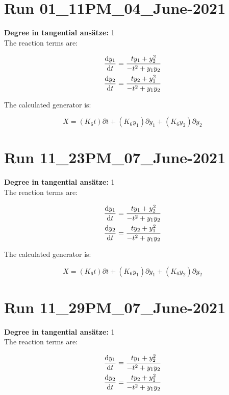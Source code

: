 \section*{Run 01\_11PM\_04\_June-2021}
\textbf{Degree in tangential ansätze:}	1\\
The reaction terms are:

\begin{align*}
\dv{y_{1}}{t}&=\frac{t y_{1} + y_{2}^{2}}{- t^{2} + y_{1} y_{2}}\\
\dv{y_{2}}{t}&=\frac{t y_{2} + y_{1}^{2}}{- t^{2} + y_{1} y_{2}}\\
\end{align*}

The calculated generator is:

\begin{equation}X=\left(K_{6} t\right)\partial t+\left(K_{6} y_{1}\right)\partial y_{1}+\left(K_{6} y_{2}\right)\partial y_{2}\end{equation}
\section*{Run 11\_23PM\_07\_June-2021}
\textbf{Degree in tangential ansätze:}	1\\
The reaction terms are:

\begin{align*}
\dv{y_{1}}{t}&=\frac{t y_{1} + y_{2}^{2}}{- t^{2} + y_{1} y_{2}}\\
\dv{y_{2}}{t}&=\frac{t y_{2} + y_{1}^{2}}{- t^{2} + y_{1} y_{2}}\\
\end{align*}

The calculated generator is:

\begin{equation}X=\left(K_{6} t\right)\partial t+\left(K_{6} y_{1}\right)\partial y_{1}+\left(K_{6} y_{2}\right)\partial y_{2}\end{equation}
\section*{Run 11\_29PM\_07\_June-2021}
\textbf{Degree in tangential ansätze:}	1\\
The reaction terms are:

\begin{align*}
\dv{y_{1}}{t}&=\frac{t y_{1} + y_{2}^{2}}{- t^{2} + y_{1} y_{2}}\\
\dv{y_{2}}{t}&=\frac{t y_{2} + y_{1}^{2}}{- t^{2} + y_{1} y_{2}}\\
\end{align*}

